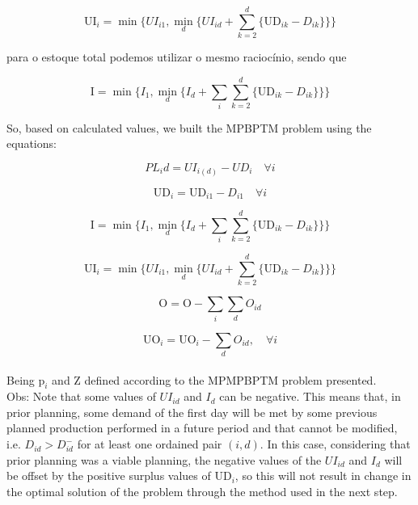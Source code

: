 \documentclass[authoryear,preprint,12pt]{elsarticle}
\begin{document}
\begin{equation}
	\textrm{UI}_{i} = \min\{UI_{i1}, \min_d\{UI_{id} + \sum_{k=2}^{d}\{\textrm{UD}_{ik} - D_{ik}\}\}\}
\end{equation}

para o estoque total podemos utilizar o mesmo raciocínio, sendo que 
 

\begin{equation}
	\textrm{I} = \min\{I_{1}, \min_d\{I_{d} + \sum_{i}\sum_{k=2}^{d}\{\textrm{UD}_{ik} - D_{ik}\}\}\}
\end{equation}

So, based on calculated values, we built the MPBPTM problem using the equations:

\begin{equation}
PL_id = UI_{i(d)} - UD_{i} \quad \forall i
\end{equation}

\begin{equation}
\textrm{UD}_{i} = \textrm{UD}_{i1} - D_{i1} \quad \forall i
\end{equation}

\begin{equation}
	\textrm{I} = \min\{I_{1}, \min_d\{I_{d} + \sum_{i}\sum_{k=2}^{d}\{\textrm{UD}_{ik} - D_{ik}\}\}\}
\end{equation}

\begin{equation}
	\textrm{UI}_{i} = \min\{UI_{i1}, \min_d\{UI_{id} + \sum_{k=2}^{d}\{\textrm{UD}_{ik} - D_{ik}\}\}\}
\end{equation}

\begin{equation}
\textrm{O} = \textrm{O} - \sum_{i}{\sum_{d}{O_{id}}}
\end{equation}

\begin{equation}
\textrm{UO}_{i} = \textrm{UO}_{i} - \sum_{d}{O_{id}}, \quad \forall i
\end{equation} \\

Being $\textrm{p}_{i}$ and $\textrm{Z}$ defined according to the MPMPBPTM problem presented. \\

Obs: Note that some values of $UI_{id}$ and  $I_{d}$ can be negative. This means that, in prior planning, some demand of the first day will be met by some previous planned production performed in a future period and that cannot be modified, i.e. $D_{id} > D_{id}^-$ for at least one ordained pair $(i,d)$. In this case, considering that prior planning was a viable planning, the negative values of the $UI_{id}$ and $I_{d}$ will be offset by the positive surplus values of $\textrm{UD}_{i}$, so this will not result in change in the optimal solution of the problem through the method used in the next step. \\
\end{document}
